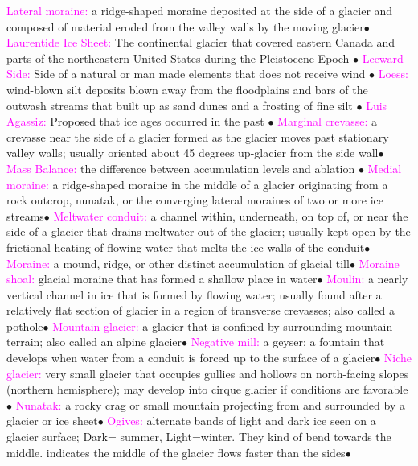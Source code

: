 \documentclass{article}
\newcommand{\ddd}{$\bullet$}
\newcommand{\pink}[1]{\textcolor{magenta}{#1}}
\newcommand{\vocab}[1]{{\pink{#1}}}
\begin{document}
\begin{multicols*}{4}
		\vocab{        Lateral moraine: } a ridge-shaped moraine deposited at the side of a glacier and composed of material eroded from the valley walls by the moving glacier\ddd
		\vocab{Laurentide Ice Sheet: }The continental glacier that covered eastern Canada and parts of the northeastern United States during the Pleistocene Epoch \ddd
		\vocab{Leeward Side: }Side of a natural or man made elements that does not receive wind \ddd
		\vocab{Loess: } wind-blown silt deposits blown away from the floodplains and bars of the outwash streams that built up as sand dunes and a frosting of fine silt \ddd
		\vocab{Luis Agassiz: } Proposed that ice ages occurred in the past  \ddd
		\vocab{        Marginal crevasse: } a crevasse near the side of a glacier formed as the glacier moves past stationary valley walls; usually oriented about 45 degrees up-glacier from the side wall\ddd
		\vocab{Mass Balance: } the difference between accumulation levels and ablation \ddd
		\vocab{        Medial moraine: } a ridge-shaped moraine in the middle of a glacier originating from a rock outcrop, nunatak, or the converging lateral moraines of two or more ice streams\ddd
		\vocab{        Meltwater conduit: } a channel within, underneath, on top of, or near the side of a glacier that drains meltwater out of the glacier; usually kept open by the frictional heating of flowing water that melts the ice walls of the conduit\ddd
		\vocab{        Moraine: } a mound, ridge, or other distinct accumulation of glacial till\ddd
		\vocab{        Moraine shoal: } glacial moraine that has formed a shallow place in water\ddd
		\vocab{        Moulin: } a nearly vertical channel in ice that is formed by flowing water; usually found after a relatively flat section of glacier in a region of transverse crevasses; also called a pothole\ddd
		\vocab{        Mountain glacier: } a glacier that is confined by surrounding mountain terrain; also called an alpine glacier\ddd
		\vocab{        Negative mill: } a geyser; a fountain that develops when water from a conduit is forced up to the surface of a glacier\ddd
		\vocab{        Niche glacier: } very small glacier that occupies gullies and hollows on north-facing slopes (northern hemisphere); may develop into cirque glacier if conditions are favorable\ddd
		\vocab{        Nunatak: } a rocky crag or small mountain projecting from and surrounded by a glacier or ice sheet\ddd
		\vocab{        Ogives: } alternate bands of light and dark ice seen on a glacier surface; Dark= summer, Light=winter. They kind of bend towards the middle. {indicates the middle of the glacier flows faster than the sides}\ddd

\end{multicols*}
\end{document}
